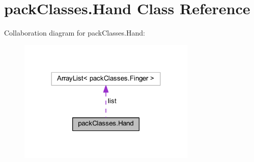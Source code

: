 \hypertarget{classpack_classes_1_1_hand}{}\section{pack\+Classes.\+Hand Class Reference}
\label{classpack_classes_1_1_hand}


Collaboration diagram for pack\+Classes.\+Hand\+:
\nopagebreak
\begin{figure}[H]
\begin{center}
\leavevmode
\includegraphics[width=240pt]{classpack_classes_1_1_hand__coll__graph}
\end{center}
\end{figure}
